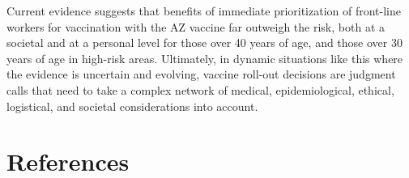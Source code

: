 \documentclass[]{elsarticle} %
\begin{document}
Current evidence suggests that benefits of immediate prioritization of
front-line workers for vaccination with the AZ vaccine far outweigh the
risk, both at a societal and at a personal level for those over 40 years
of age, and those over 30 years of age in high-risk areas. Ultimately,
in dynamic situations like this where the evidence is uncertain and
evolving, vaccine roll-out decisions are judgment calls that need to
take a complex network of medical, epidemiological, ethical, logistical,
and societal considerations into account.

\hypertarget{references}{%
\section*{References}\label{references}}
\end{document}
